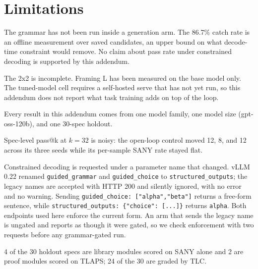 \section{Limitations}\label{sec:limitations}

The grammar has not been run inside a generation arm. The 86.7\% catch rate
is an offline measurement over saved candidates, an upper bound on what
decode-time constraint would remove. No claim about pass rate under
constrained decoding is supported by this addendum.

The 2x2 is incomplete. Framing L has been measured on the base model only.
The tuned-model cell requires a self-hosted serve that has not yet run, so
this addendum does not report what task training adds on top of the loop.

Every result in this addendum comes from one model family, one model size
(gpt-oss-120b), and one 30-spec holdout.

Spec-level pass@k at $k{=}32$ is noisy: the open-loop control moved 12, 8,
and 12 across its three seeds while its per-sample SANY rate stayed flat.

Constrained decoding is requested under a parameter name that changed. vLLM
0.22 renamed \texttt{guided\_grammar} and \texttt{guided\_choice} to
\texttt{structured\_outputs}; the legacy names are accepted with HTTP 200 and
silently ignored, with no error and no warning. Sending
\texttt{guided\_choice: ["alpha","beta"]} returns a free-form sentence, while
\texttt{structured\_outputs: \{"choice": [...]\}} returns \texttt{alpha}.
Both endpoints used here enforce the current form. An arm that sends the legacy
name is ungated and reports as though it were gated, so we check enforcement
with two requests before any grammar-gated run.

4 of the 30 holdout specs are library modules scored on SANY alone and 2 are
proof modules scored on TLAPS; 24 of the 30 are graded by TLC.
